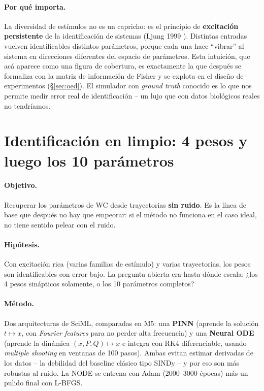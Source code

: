 \documentclass[11pt,a4paper]{article}
\begin{document}
\paragraph{Por qué importa.} La diversidad de estímulos no es un capricho: es el principio de \textbf{excitación persistente} de la identificación de sistemas (Ljung 1999 \cite{ljung}). Distintas entradas vuelven identificables distintos parámetros, porque cada una hace ``vibrar'' al sistema en direcciones diferentes del espacio de parámetros. Esta intuición, que acá aparece como una figura de cobertura, es exactamente la que después se formaliza con la matriz de información de Fisher y se explota en el diseño de experimentos (§\ref{sec:oed}). El simulador con \emph{ground truth} conocido es lo que nos permite medir error real de identificación \--- un lujo que con datos biológicos reales no tendríamos.

\section{Identificación en limpio: 4 pesos y luego los 10 parámetros}
\label{sec:limpio}

\paragraph{Objetivo.} Recuperar los parámetros de WC desde trayectorias \textbf{sin ruido}. Es la línea de base que después no hay que empeorar: si el método no funciona en el caso ideal, no tiene sentido pelear con el ruido.

\paragraph{Hipótesis.} Con excitación rica (varias familias de estímulo) y varias trayectorias, los pesos son identificables con error bajo. La pregunta abierta era hasta dónde escala: ¿los 4 pesos sinápticos solamente, o los 10 parámetros completos?

\paragraph{Método.} Dos arquitecturas de SciML, comparadas en M5: una \textbf{PINN} (aprende la solución $t\mapsto x$, con \emph{Fourier features} para no perder alta frecuencia) y una \textbf{Neural ODE} (aprende la dinámica $(x,P,Q)\mapsto\dot x$ e integra con RK4 diferenciable, usando \emph{multiple shooting} en ventanas de 100 pasos). Ambas evitan estimar derivadas de los datos \--- la debilidad del baseline clásico tipo SINDy \--- y por eso son más robustas al ruido. La NODE se entrena con Adam (2000--3000 épocas) más un pulido final con L-BFGS.
\end{document}

